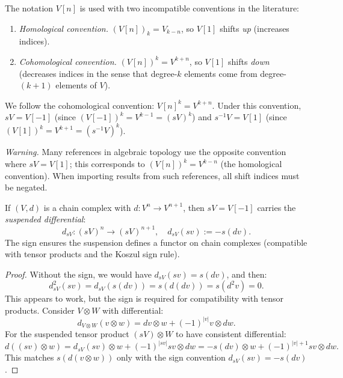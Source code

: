 \begin{remark}
\label{rem:shift-notation}
The notation $V[n]$ is used with two incompatible conventions in the literature:
\begin{enumerate}[label=(\roman*)]
\item \emph{Homological convention.} $(V[n])_k = V_{k-n}$, so $V[1]$ shifts
\emph{up} (increases indices).
\item \emph{Cohomological convention.} $(V[n])^k = V^{k+n}$, so $V[1]$ shifts
\emph{down} (decreases indices in the sense that degree-$k$ elements come from
degree-$(k+1)$ elements of $V$).
\end{enumerate}
We follow the cohomological convention: $V[n]^k = V^{k+n}$. Under this convention,
$sV = V[-1]$ (since $(V[-1])^k = V^{k-1} = (sV)^k$) and
$s^{-1}V = V[1]$ (since $(V[1])^k = V^{k+1} = (s^{-1}V)^k$).

\emph{Warning.} Many references in algebraic topology use the opposite convention where $sV = V[1]$; this corresponds to $(V[n])^k = V^{k-n}$ (the homological convention). When importing results from such references, all shift indices must be negated.
\end{remark}

\begin{proposition}
\label{prop:susp-diff}
If $(V, d)$ is a chain complex with $d: V^n \to V^{n+1}$, then $sV = V[-1]$
carries the \emph{suspended differential}:
\[
d_{sV}: (sV)^n \to (sV)^{n+1}, \quad d_{sV}(sv) := -s(dv).
\]
The sign ensures the suspension defines a functor on chain complexes (compatible with tensor products and the Koszul sign rule).
\end{proposition}

\begin{proof}
Without the sign, we would have $d_{sV}(sv) = s(dv)$, and then:
\[
d_{sV}^2(sv) = d_{sV}(s(dv)) = s(d(dv)) = s(d^2 v) = 0.
\]
This appears to work, but the sign is required for compatibility with tensor
products. Consider $V \otimes W$ with differential:
\[
d_{V \otimes W}(v \otimes w) = dv \otimes w + (-1)^{|v|} v \otimes dw.
\]
For the suspended tensor product $(sV) \otimes W$ to have consistent differential:
\[
d((sv) \otimes w) = d_{sV}(sv) \otimes w + (-1)^{|sv|} sv \otimes dw
= -s(dv) \otimes w + (-1)^{|v|+1} sv \otimes dw.
\]
This matches $s(d(v \otimes w))$ only with the sign convention $d_{sV}(sv) = -s(dv)$.
\end{proof}

